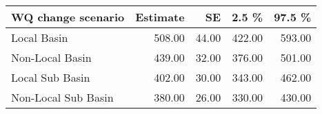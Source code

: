 \begin{table}[ht]
\centering
\begin{tabular}{lrrrr}
  \hline
WQ change scenario & Estimate & SE & 2.5 \% & 97.5 \% \\ 
  \hline
Local Basin & 508.00 & 44.00 & 422.00 & 593.00 \\ 
  Non-Local Basin & 439.00 & 32.00 & 376.00 & 501.00 \\ 
  Local Sub Basin & 402.00 & 30.00 & 343.00 & 462.00 \\ 
  Non-Local  Sub Basin & 380.00 & 26.00 & 330.00 & 430.00 \\ 
   \hline
\end{tabular}
\end{table}

